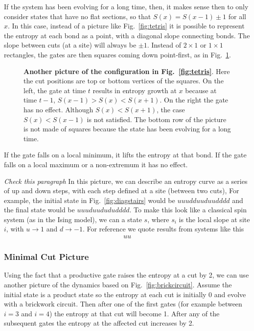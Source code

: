 If the system has been evolving for a long time, then, it makes sense then to only consider states that have no flat sections, so that $S(x) = S(x-1)\pm1$ for all $x$. In this case, instead of a picture like Fig.~\ref{fig:tetris} it is possible to represent the entropy at each bond as a point, with a diagonal slope connecting bonds. The slope between cuts (at a site) will always be $\pm1$. Instead of $2\times1$ or $1\times1$ rectangles, the gates are then squares coming down point-first, as in Fig.~\ref{fig:diaggate}. 
\begin{figure}
	\centering
	
	\caption{\textbf{Another picture of the configuration in Fig.~\ref{fig:tetris}}. Here the cut positions are top or bottom vertices of the squares. On the left, the gate at time $t$ results in entropy growth at $x$ because at time $t-1$, $S(x-1) > S(x) < S(x+1)$. On the right the gate has no effect. Although $S(x) < S(x+1)$, the case $S(x) < S(x-1)$ is not satisfied. The bottom row of the picture is not made of squares because the state has been evolving for a long time.}
	\label{fig:diaggate}
\end{figure}
If the gate falls on a local minimum, it lifts the entropy at that bond. If the gate falls on a local maximum or a non-extremum it has no effect.

\emph{Check this paragraph}
In this picture, we can describe an entropy curve as a series of up and down steps, with each step defined at a site (between two cuts), For example, the initial state in Fig.~\ref{fig:diagstairs} would be $uuudduuduudddd$ and the final state would be $uuuduudududddd$. To make this look like a classical spin system (as in the Ising model), we can a state $s$, where $s_i$ is the local slope at site $i$, with $u\to1$ and $d\to-1$. For reference we quote results from systems like this
\begin{align}
uu
\end{align}

\subsubsection{Minimal Cut Picture} \label{subsub:mincut}

Using the fact that a productive gate raises the entropy at a cut by 2, we can use another picture of the dynamics based on Fig.~\ref{fig:brickcircuit}. Assume the initial state is a product state so the entropy at each cut is initially 0 and evolve with a brickwork circuit. Then after one of the first gates (for example between $i=3$ and $i=4$) the entropy at that cut will become 1. After any of the subsequent gates the entropy at the affected cut increases by 2.

